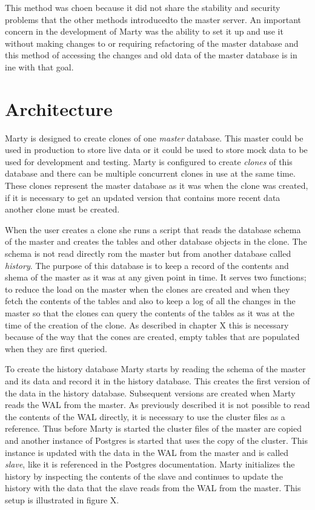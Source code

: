 \documentclass[a4paper,12pt,twoside,BCOR=10mm]{scrbook}
\begin{document}
This method was choen because it did not share the stability and security problems that the other methods introducedto the master server. An important concern in the development of Marty was the ability to set it up and use it without making changes to or requiring refactoring of the master database and this method of accessing the changes and old data of the master database is in ine with that goal.

\section{Architecture}
Marty is designed to create clones of one \textit{master} database. This master could be used in production to store live data or it could be used to store mock data to be used for development and testing. Marty is configured to create \textit{clones} of this database and there can be multiple concurrent clones in use at the same time. These clones represent the master database as it was when the clone was created, if it is necessary to get an updated version that contains more recent data another clone must be created.

When the user creates a clone she runs a script that reads the database schema of the master and creates the tables and other database objects in the clone. The schema is not read directly rom the master but from another database called \textit{history}. The purpose of this database is to keep a record of the contents and shema of the master as it was at any given point in time. It serves two functions; to reduce the load on the master when the clones are created and when they fetch the contents of the tables and also to keep a log of all the changes in the master so that the clones can query the contents of the tables as it was at the time of the creation of the clone. As described in chapter X this is necessary because of the way that the cones are created, empty tables that are populated when they are first queried.


To create the history database Marty starts by reading the schema of the master and its data and record it in the history database. This creates the first version of the data in the history database. Subsequent versions are created when Marty reads the WAL from the master. As previously described it is not possible to read the contents of the WAL directly, it is necessary to use the cluster files as a reference. Thus before Marty is started the cluster files of the master are copied and another instance of Postgres is started that uses the copy of the cluster. This instance is updated with the data in the WAL from the master and is called \textit{slave}, like it is referenced in the Postgres documentation. Marty initializes the history by inspecting the contents of the slave and continues to update the history with the data that the slave reads from the WAL from the master. This setup is illustrated in figure X.
\end{document}
